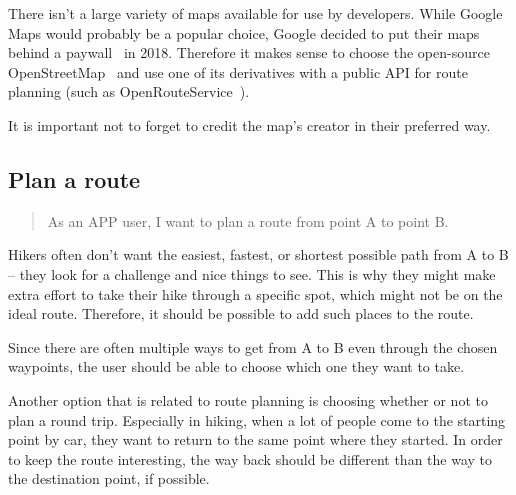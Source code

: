 There isn't a large variety of maps available for use by developers.
While Google Maps would probably be a popular choice, Google decided to put their maps behind a paywall~\cite{google-maps-paywall} in 2018.
Therefore it makes sense to choose the open-source OpenStreetMap~\cite{OpenStreetMap} and use one of its derivatives with a public API for route planning (such as OpenRouteService~\cite{OpenRouteService}).

It is important not to forget to credit the map's creator in their preferred way.

\subsection{Plan a route}\label{US:map-plan}
\begin{quote}
As an APP user, I want to plan a route from point A to point B.
\end{quote}

Hikers often don't want the easiest, fastest, or shortest possible path from A to B -- they look for a challenge and nice things to see.
This is why they might make extra effort to take their hike through a specific spot, which might not be on the ideal route.
Therefore, it should be possible to add such places to the route.

Since there are often multiple ways to get from A to B even through the chosen waypoints, the user should be able to choose which one they want to take.

Another option that is related to route planning is choosing whether or not to plan a round trip.
Especially in hiking, when a lot of people come to the starting point by car, they want to return to the same point where they started.
In order to keep the route interesting, the way back should be different than the way to the destination point, if possible.

